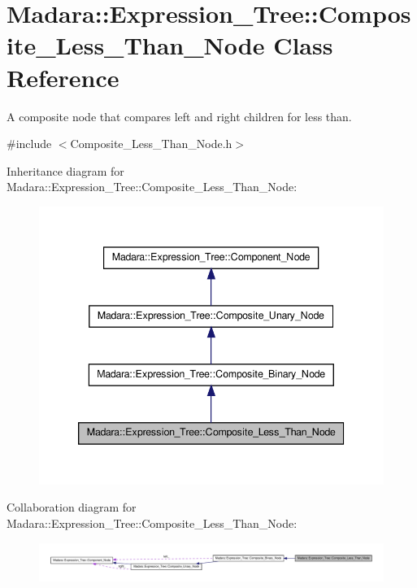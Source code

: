 \hypertarget{classMadara_1_1Expression__Tree_1_1Composite__Less__Than__Node}{
\section{Madara::Expression\_\-Tree::Composite\_\-Less\_\-Than\_\-Node Class Reference}
\label{dd/d5f/classMadara_1_1Expression__Tree_1_1Composite__Less__Than__Node}
}


A composite node that compares left and right children for less than.  




{\ttfamily \#include $<$Composite\_\-Less\_\-Than\_\-Node.h$>$}



Inheritance diagram for Madara::Expression\_\-Tree::Composite\_\-Less\_\-Than\_\-Node:
\nopagebreak
\begin{figure}[H]
\begin{center}
\leavevmode
\includegraphics[width=342pt]{d3/d49/classMadara_1_1Expression__Tree_1_1Composite__Less__Than__Node__inherit__graph}
\end{center}
\end{figure}


Collaboration diagram for Madara::Expression\_\-Tree::Composite\_\-Less\_\-Than\_\-Node:
\nopagebreak
\begin{figure}[H]
\begin{center}
\leavevmode
\includegraphics[width=400pt]{d1/d67/classMadara_1_1Expression__Tree_1_1Composite__Less__Than__Node__coll__graph}
\end{center}
\end{figure}
